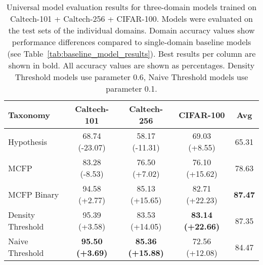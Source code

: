 \begin{table}[ht]
\centering
\caption{Universal model evaluation results for three-domain models trained on Caltech-101 + Caltech-256 + CIFAR-100. Models were evaluated on the test sets of the individual domains. Domain accuracy values show performance differences compared to single-domain baseline models (see Table~\ref{tab:baseline_model_results}). Best results per column are shown in bold. All accuracy values are shown as percentages. Density Threshold models use parameter 0.6, Naive Threshold models use parameter 0.1.}
\label{tab:universal_model_results_3domain}
\begin{tabular}{lcccc}
\toprule
Taxonomy & Caltech-101 & Caltech-256 & CIFAR-100 & Avg \\
\midrule
Hypothesis & 68.74 (-23.07) & 58.17 (-11.31) & 69.03 (+8.55) & 65.31 \\
MCFP & 83.28 (-8.53) & 76.50 (+7.02) & 76.10 (+15.62) & 78.63 \\
MCFP Binary & 94.58 (+2.77) & 85.13 (+15.65) & 82.71 (+22.23) & \textbf{87.47} \\
Density Threshold & 95.39 (+3.58) & 83.53 (+14.05) & \textbf{83.14 (+22.66)} & 87.35 \\
Naive Threshold & \textbf{95.50 (+3.69)} & \textbf{85.36 (+15.88)} & 72.56 (+12.08) & 84.47 \\
\bottomrule
\end{tabular}
\end{table}
